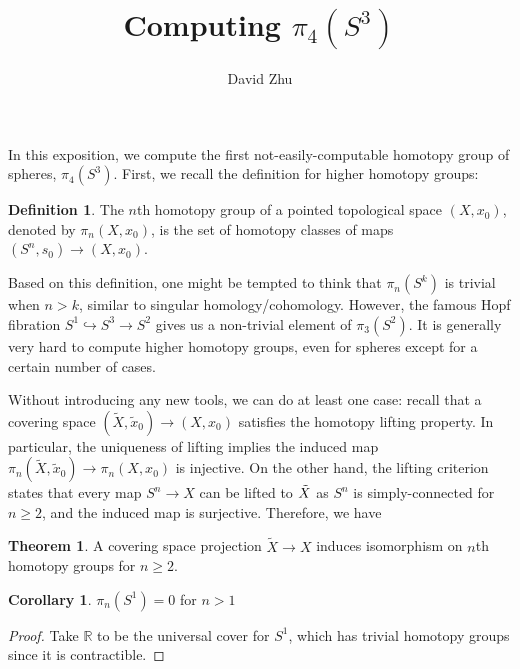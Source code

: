 \documentclass{article}
\title{Computing $\pi_4(S^3)$}
\author{David Zhu}
\theoremstyle{definition}
\newtheorem{theorem}{Theorem}[section]
\theoremstyle{definition}
\theoremstyle{definition}
\theoremstyle{definition}
\newtheorem{definition}{Definition}[theorem]
\theoremstyle{definition}
\newtheorem{corollary}{Corollary}[theorem]
\theoremstyle{definition}
\begin{document}
\maketitle


In this exposition, we compute the first not-easily-computable homotopy group of spheres, $\pi_4(S^3)$. First, we recall the definition for higher homotopy groups:

\begin{tcolorbox}[colback=purple!5!white,colframe=purple!75!black]
\begin{definition}
The $n$th homotopy group of a pointed topological space $(X,x_0)$, denoted by $\pi_n(X,x_0)$, is the set of homotopy classes of maps $(S^n,s_0)\to (X,x_0)$.
\end{definition}
\end{tcolorbox}

Based on this definition, one might be tempted to think that $\pi_n(S^k)$ is trivial when $n>k$, similar to singular homology/cohomology. However, the famous Hopf fibration $S^1\hookrightarrow S^3\to S^2$ gives us a non-trivial element of $\pi_3(S^2)$. It is generally very hard to compute higher homotopy groups, even for spheres except for a certain number of cases.

Without introducing any new tools, we can do at least one case: recall that a covering space $(\tilde{X},\tilde{x}_0)\to (X,x_0)$ satisfies the homotopy lifting property. In particular, the uniqueness of lifting implies the induced map $\pi_n(\tilde{X},\tilde{x}_0)\to \pi_n(X,x_0)$ is injective. On the other hand, the lifting criterion states that every map $S^n\to X$ can be lifted to $\Tilde{X}$ as $S^n$ is simply-connected for $n\geq 2$, and the induced map is surjective. Therefore, we have

\begin{tcolorbox}[colback=red!5!white,colframe=red!30!white]
\begin{theorem}
A covering space projection $\tilde{X}\to X$ induces isomorphism on $n$th homotopy groups for $n\geq 2$.
\end{theorem}
\end{tcolorbox}

\begin{tcolorbox}[colback=green!5!white,colframe=green!30!white]
\begin{corollary}
    $\pi_n(S^1)=0$ for $n>1$
\end{corollary}
\end{tcolorbox}
\begin{proof}
    Take $\mathbb{R}$ to be the universal cover for $S^1$, which has trivial homotopy groups since it is contractible.
\end{proof}
\end{document}

